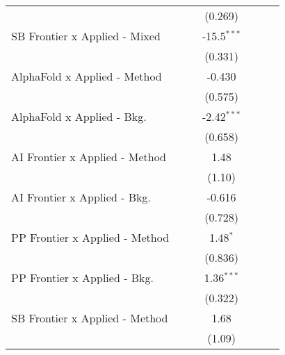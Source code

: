 \begin{tabular}{lcccccc}
                                  &               &              & (0.269)       &              &        &   \\   
   SB Frontier x Applied - Mixed  &               &              & -15.5$^{***}$ &              &        &   \\   
                                  &               &              & (0.331)       &              &        &   \\   
   AlphaFold x Applied - Method   &               &              & -0.430        &              &        &   \\   
                                  &               &              & (0.575)       &              &        &   \\   
   AlphaFold x Applied - Bkg.     &               &              & -2.42$^{***}$ &              &        &   \\   
                                  &               &              & (0.658)       &              &        &   \\   
   AI Frontier x Applied - Method &               &              & 1.48          &              &        &   \\   
                                  &               &              & (1.10)        &              &        &   \\   
   AI Frontier x Applied - Bkg.   &               &              & -0.616        &              &        &   \\   
                                  &               &              & (0.728)       &              &        &   \\   
   PP Frontier x Applied - Method &               &              & 1.48$^{*}$    &              &        &   \\   
                                  &               &              & (0.836)       &              &        &   \\   
   PP Frontier x Applied - Bkg.   &               &              & 1.36$^{***}$  &              &        &   \\   
                                  &               &              & (0.322)       &              &        &   \\   
   SB Frontier x Applied - Method &               &              & 1.68          &              &        &   \\   
                                  &               &              & (1.09)        &              &        &   \\   

\end{tabular}
